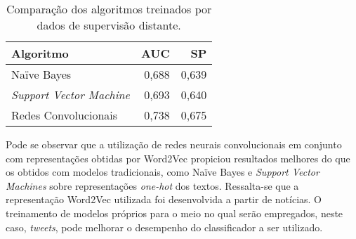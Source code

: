 \begin{table}[h]
    \begin{center}
        \begin{tabular}{| l | r | r |}
        \hline
        \textbf{Algoritmo} & \textbf{AUC} & \textbf{SP} \\ \hline
        Naïve Bayes & 0,688 & 0,639 \\ \hline
        \textit{Support Vector Machine} & 0,693 & 0,640 \\ \hline
        Redes Convolucionais & 0,738 & 0,675 \\ \hline
        \end{tabular}
        \caption{Comparação dos algoritmos treinados por dados de supervisão distante.}
        \label{tab:all_compara}
    \end{center}
\end{table}

Pode se observar que a utilização de redes neurais convolucionais em conjunto com representações obtidas por
Word2Vec propiciou resultados melhores do que os obtidos com modelos tradicionais, como Naïve Bayes e
\textit{Support Vector Machines} sobre representações \textit{one-hot} dos textos.
Ressalta-se que a representação Word2Vec utilizada foi desenvolvida a partir de notícias.
O treinamento de modelos próprios para o meio no qual serão empregados, neste caso, \textit{tweets}, pode melhorar o
desempenho do classificador a ser utilizado.
